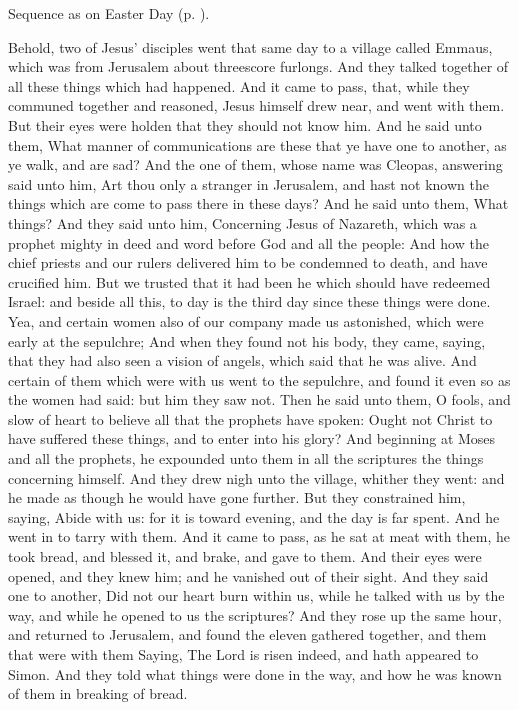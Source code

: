 \begin{rubric}
    Sequence as on Easter Day (p. \pageref{PaschalSequence}).
\end{rubric}

 Behold, two of Jesus' disciples went that same day to a village called Emmaus, which was from Jerusalem about threescore furlongs. And they talked together of all these things which had happened. And it came to pass, that, while they communed together and reasoned, Jesus himself drew near, and went with them. But their eyes were holden that they should not know him. And he said unto them, What manner of communications are these that ye have one to another, as ye walk, and are sad? And the one of them, whose name was Cleopas, answering said unto him, Art thou only a stranger in Jerusalem, and hast not known the things which are come to pass there in these days? And he said unto them, What things? And they said unto him, Concerning Jesus of Nazareth, which was a prophet mighty in deed and word before God and all the people: And how the chief priests and our rulers delivered him to be condemned to death, and have crucified him. But we trusted that it had been he which should have redeemed Israel: and beside all this, to day is the third day since these things were done. Yea, and certain women also of our company made us astonished, which were early at the sepulchre; And when they found not his body, they came, saying, that they had also seen a vision of angels, which said that he was alive. And certain of them which were with us went to the sepulchre, and found it even so as the women had said: but him they saw not. Then he said unto them, O fools, and slow of heart to believe all that the prophets have spoken: Ought not Christ to have suffered these things, and to enter into his glory? And beginning at Moses and all the prophets, he expounded unto them in all the scriptures the things concerning himself. And they drew nigh unto the village, whither they went: and he made as though he would have gone further. But they constrained him, saying, Abide with us: for it is toward evening, and the day is far spent. And he went in to tarry with them. And it came to pass, as he sat at meat with them, he took bread, and blessed it, and brake, and gave to them. And their eyes were opened, and they knew him; and he vanished out of their sight. And they said one to another, Did not our heart burn within us, while he talked with us by the way, and while he opened to us the scriptures? And they rose up the same hour, and returned to Jerusalem, and found the eleven gathered together, and them that were with them Saying, The Lord is risen indeed, and hath appeared to Simon. And they told what things were done in the way, and how he was known of them in breaking of bread.

